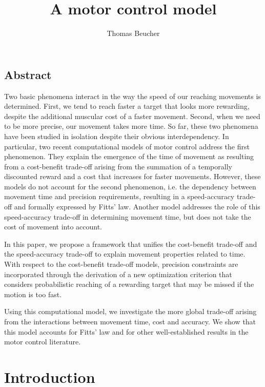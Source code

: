 \documentclass[pdftex,a4paper,11pt]{report}
\begin{document}
\title{A motor control model}
\author{Thomas Beucher}
\maketitle

\section*{Abstract}
Two basic phenomena interact in the way the speed of our reaching movements is determined.
First, we tend to reach faster a target that looks more rewarding, despite the additional muscular cost
of a faster movement.
Second, when we need to be more precise, our movement takes more time.
So far, these two phenomena have been studied in isolation despite their obvious interdependency.
In particular, two recent computational models of motor control address the first phenomenon. They explain the emergence of the time of movement as resulting from a cost-benefit trade-off arising from the summation of a temporally discounted reward and a cost that increases for faster movements.
However, these models do not account for the second phenomenon, i.e. the dependency between movement time and precision requirements, resulting in a speed-accuracy trade-off and formally expressed by Fitts' law. Another model addresses the role of this speed-accuracy trade-off in determining movement time, but does not take the cost of movement into account.

In this paper, we propose a framework that unifies the cost-benefit trade-off and the speed-accuracy trade-off to explain movement properties related to time.
With respect to the cost-benefit trade-off models, precision constraints are incorporated through the derivation of a new optimization criterion that considers probabilistic reaching of a rewarding target that may be missed if the motion is too fast.

Using this computational model, we investigate the more global trade-off arising from the interactions between movement time, cost and accuracy. We show that this model accounts for Fitts' law and for other well-established results in the motor control literature.

\chapter{Introduction}
\end{document}
